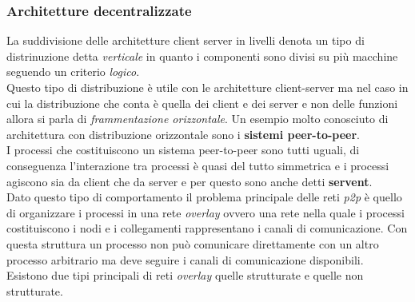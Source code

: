 \subsubsection{Architetture decentralizzate}
La suddivisione delle architetture client server in livelli denota un tipo di distrinuzione detta \emph{verticale} in quanto i componenti sono divisi su più macchine seguendo un criterio \emph{logico}.\\
Questo tipo di distribuzione è utile con le architetture client-server ma nel caso in cui la distribuzione che conta è quella dei client e dei server e non delle funzioni allora si parla di \emph{frammentazione orizzontale}. Un esempio molto conosciuto di architettura con distribuzione orizzontale sono i \textbf{sistemi peer-to-peer}.\\
I processi che costituiscono un sistema peer-to-peer sono tutti uguali, di conseguenza l'interazione tra processi è quasi del tutto simmetrica e i processi agiscono sia da client che da server e per questo sono anche detti \textbf{servent}.\\
Dato questo tipo di comportamento il problema principale delle reti \emph{p2p} è quello di organizzare i processi in una rete \emph{overlay} ovvero una rete nella quale i processi costituiscono i nodi e i collegamenti rappresentano i canali di comunicazione. Con questa struttura un processo non può comunicare direttamente con un altro processo arbitrario ma deve seguire i canali di comunicazione disponibili.\\
Esistono due tipi principali di reti \emph{overlay} quelle strutturate e quelle non strutturate.
